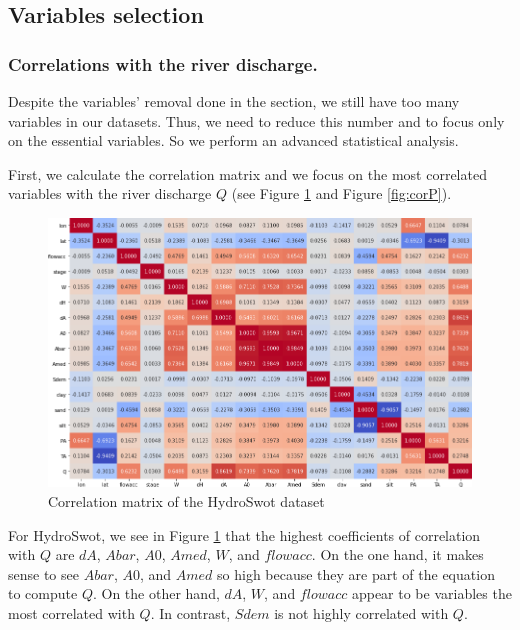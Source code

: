 \subsection{Variables selection \label{variables_selection}}
\subsubsection{Correlations with the river discharge.\label{section231}}

Despite the variables' removal done in the  section, we still have too many variables in our datasets.
Thus, we need to reduce this number and to focus only on the essential variables. So we perform an advanced statistical analysis.

First, we calculate the correlation matrix and we focus on the most correlated variables with the river discharge $Q$ (see Figure \ref{fig:corH} and Figure \ref{fig:corP}).
\begin{figure}[H]
\centering
\includegraphics[scale=0.4]{Graph/correlation_hydro.png}
\caption{Correlation matrix of the HydroSwot dataset}
\label{fig:corH}
\end{figure}

For HydroSwot, we see in Figure \ref{fig:corH} that the highest coefficients of correlation with $Q$ are $dA$, $Abar$, $A0$, $Amed$, $W$, and $flowacc$. On the one hand, it makes sense to see $Abar$, $A0$, and $Amed$ so high because they are part of the equation to compute $Q$. On the other hand, $dA$, $W$, and $flowacc$ appear to be variables the most correlated with $Q$. In contrast, $Sdem$ is not highly correlated with $Q$.

